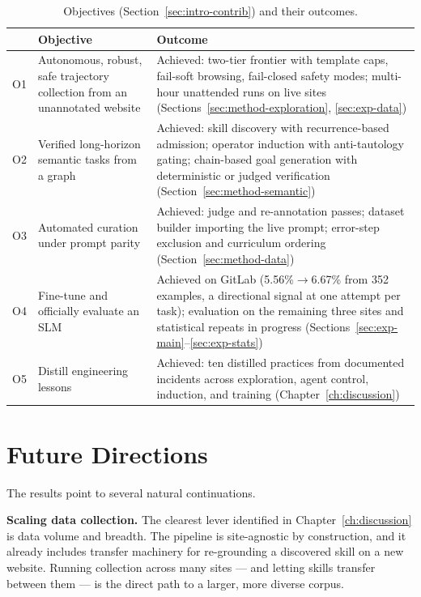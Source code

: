 \begin{table}[H]
\centering
\caption[Objectives of the thesis and their outcomes]{Objectives
(Section~\ref{sec:intro-contrib}) and their outcomes.}
\label{tab:objectives}
\small
\begin{tabular}{L{1.0cm} L{5.6cm} L{6.4cm}}
\toprule
 & \textbf{Objective} & \textbf{Outcome} \\
\midrule
O1 & Autonomous, robust, safe trajectory collection from an unannotated
website & Achieved: two-tier frontier with template caps, fail-soft browsing,
fail-closed safety modes; multi-hour unattended runs on live sites
(Sections~\ref{sec:method-exploration}, \ref{sec:exp-data}) \\
\addlinespace
O2 & Verified long-horizon semantic tasks from a graph & Achieved: skill
discovery with recurrence-based admission; operator induction with
anti-tautology gating; chain-based goal generation with deterministic or
judged verification (Section~\ref{sec:method-semantic}) \\
\addlinespace
O3 & Automated curation under prompt parity & Achieved: judge and
re-annotation passes; dataset builder importing the live prompt; error-step
exclusion and curriculum ordering (Section~\ref{sec:method-data}) \\
\addlinespace
O4 & Fine-tune and officially evaluate an SLM & Achieved on GitLab
(5.56\%$\rightarrow$6.67\% from 352 examples, a directional signal at one
attempt per task); evaluation on the remaining
three sites and statistical repeats in progress
(Sections~\ref{sec:exp-main}--\ref{sec:exp-stats}) \\
\addlinespace
O5 & Distill engineering lessons & Achieved: ten distilled practices from
documented incidents across exploration, agent control, induction, and
training (Chapter~\ref{ch:discussion}) \\
\bottomrule
\end{tabular}
\end{table}

\section{Future Directions}
\label{sec:conc-future}

The results point to several natural continuations.

\textbf{Scaling data collection.} The clearest lever identified in
Chapter~\ref{ch:discussion} is data volume and breadth. The pipeline is
site-agnostic by construction, and it already includes transfer machinery
for re-grounding a discovered skill on a new website. Running collection
across many sites --- and letting skills transfer between them --- is the
direct path to a larger, more diverse corpus.

